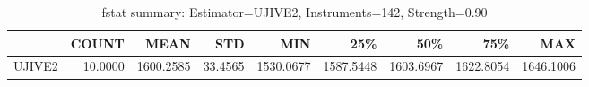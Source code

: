\begin{table}[ht]
\centering
\caption{fstat summary: Estimator=UJIVE2, Instruments=142, Strength=0.90}
\begin{tabular}{lrrrrrrrr}
\toprule
 & COUNT & MEAN & STD & MIN & 25\% & 50\% & 75\% & MAX \\
\midrule
UJIVE2 & 10.0000 & 1600.2585 & 33.4565 & 1530.0677 & 1587.5448 & 1603.6967 & 1622.8054 & 1646.1006 \\
\bottomrule
\end{tabular}
\end{table}
